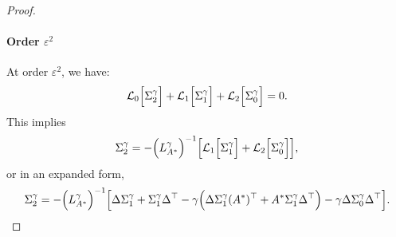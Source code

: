 \documentclass[10pt,a4paper]{amsart}
\begin{document}
\begin{proof}
\paragraph{Order \(\varepsilon^2\)}
At order $\varepsilon^2$, we have:
 \begin{align*}
\mathcal{L}_0\Bigl[\Sigma_2^\gamma\Bigr] + \mathcal{L}_1\Bigl[\Sigma_1^\gamma\Bigr] + \mathcal{L}_2\Bigl[\Sigma_0^\gamma\Bigr] = 0.
 \end{align*}
This implies
 \begin{align*}
\Sigma_2^\gamma = -\Bigl(L^\gamma_{A^*}\Bigr)^{-1}\Bigl[
\mathcal{L}_1\Bigl[\Sigma_1^\gamma\Bigr] + \mathcal{L}_2\Bigl[\Sigma_0^\gamma\Bigr]
\Bigr],
 \end{align*}
or in an expanded form,
 \begin{align*}
\Sigma_2^\gamma = -\Bigl(L^\gamma_{A^*}\Bigr)^{-1}\Bigl[
  \Delta  \Sigma_1^\gamma + \Sigma_1^\gamma  \Delta^\top - \gamma\Bigl(\Delta  \Sigma_1^\gamma  (A^*)^\top + A^*  \Sigma_1^\gamma  \Delta^\top\Bigr)
- \gamma   \Delta  \Sigma_0^\gamma  \Delta^\top
\Bigr].
 \end{align*}
\end{proof}
\end{document}
